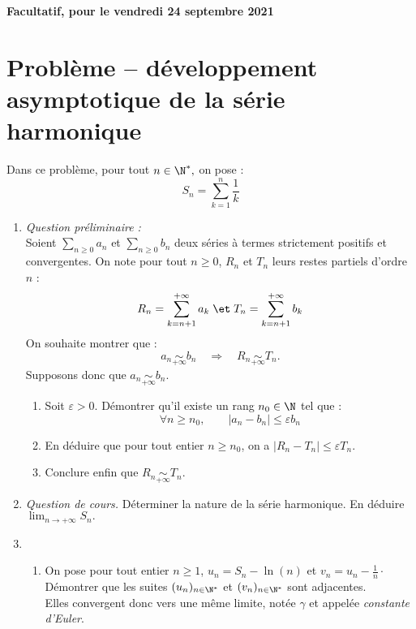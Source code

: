 \documentclass[a4paper,french,11pt,twoside]{VcCours}
\begin{document}
\begin{center}
\large\bf 
Facultatif, pour le vendredi 24 septembre 2021
\end{center}
\separationTitre


\section*{Problème -- développement asymptotique de la série harmonique}

Dans ce problème, pour tout $n\in\N^*,$ on pose :
$$S_n=\sum_{k=1}^n\frac{1}{k} $$

\medskip

\begin{enumerate}

\item \textit{Question préliminaire :}\\
Soient $\sum_{n \geq 0} a_n$ et $\sum_{n \geq 0} b_n$ deux séries à termes strictement positifs et convergentes. On note pour tout $n \geq 0$, $R_n$ et $T_n$ leurs restes partiels d'ordre $n$ :
$$R_n=\sum_{k=n+1}^{+\infty} a_k \; \et \; T_n=\sum_{k=n+1}^{+\infty} b_k$$ 
On souhaite montrer que :
$$a_n \mathop{\sim}\limits_{+\infty} b_n \quad \Longrightarrow \quad R_n \mathop{\sim}\limits_{+\infty} T_n.$$
Supposons donc que $a_n \mathop{\sim}\limits_{+\infty} b_n.$
	
	
	\begin{enumerate}
		\item Soit $\varepsilon>0$. Démontrer qu'il existe un rang $n_0\in\N$ tel que :
		$$\forall n\geq n_0,\qquad |a_n-b_n|\leq \varepsilon b_n$$
		
		\item En déduire que pour tout entier $n\geq n_0$, on a $|R_n-T_n|\leq \varepsilon T_n.$
		
		\item Conclure enfin que $R_n \mathop{\sim}\limits_{+\infty} T_n.$
	\end{enumerate}
	
	
	\item \textit{Question de cours.} Déterminer la nature de la série harmonique. En déduire $\lim_{n\to+\infty}S_n.$
	
	
	
	\item
	\begin{enumerate}
		\item  On pose pour tout entier $n \geq 1$, $u_n=S_n-\ln(n)$ et $v_n=u_n-\frac{1}{n} \cdot$
		\\
	Démontrer que les suites $(u_n)_{n\in\N^*}$ et $(v_n)_{n\in\N^*}$ sont adjacentes.\\
	Elles convergent donc vers une même limite, notée $\gamma$ et appelée \textit{constante d'Euler}.
	

\end{enumerate}
\end{enumerate}
\end{document}
